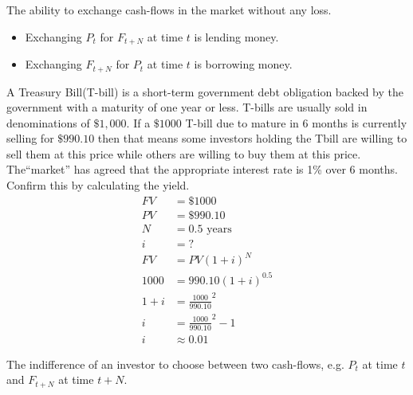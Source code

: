 \begin{definition}
    The ability to exchange cash-flows in the market without any loss. \\
    \begin{itemize}
        \item Exchanging $P_t$ for $F_{t+N}$ at time $t$ is lending money.
        \item Exchanging $F_{t+N}$ for $P_t$ at time $t$ is borrowing money.
    \end{itemize}
\end{definition}

\begin{example}
    A Treasury Bill(T-bill) is a short-term government debt obligation backed by the government with a maturity of one year or less. T-bills are usually sold in denominations of $\$1,000$. If a $\$1000$ T-bill due to mature in 6 months is currently selling for $\$990.10$ then that means some investors holding the Tbill are willing to sell them at this price while others are willing to buy them at this price. The“market” has agreed that the appropriate interest rate is 1\% over 6 months. Confirm this by calculating the yield.
    \begin{align*}
        FV   & = \$1000                      \\
        PV   & = \$990.10                    \\
        N    & = 0.5 \text{ years}           \\
        i    & = ?                           \\
        FV   & = PV(1+i)^N                   \\
        1000 & = 990.10(1+i)^{0.5}           \\
        1+i  & = {\frac{1000}{990.10}}^2     \\
        i    & = {\frac{1000}{990.10}}^2 - 1 \\
        i    & \approx 0.01
    \end{align*}
\end{example}

\begin{definition}
    The indifference of an investor to choose between two cash-flows, e.g. $P_t$ at time $t$ and $F_{t+N}$ at time $t+N$.
\end{definition}


